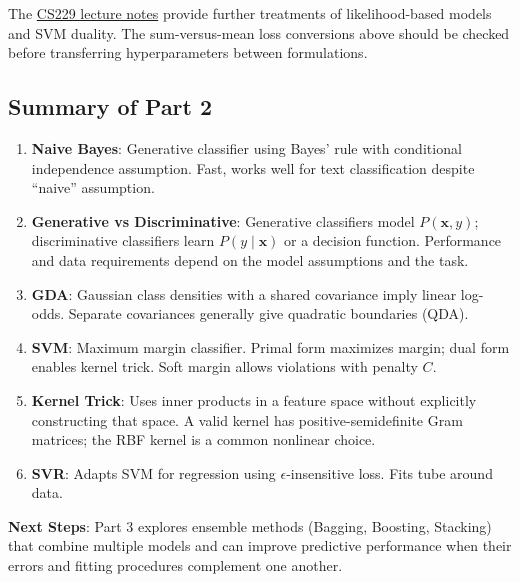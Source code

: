 \documentclass[11pt,twoside]{article}
\numberwithin{equation}{section}
\newcommand{\vect}[1]{\bm{#1}}
\theoremstyle{plain}
\theoremstyle{definition}
\theoremstyle{remark}
\begin{document}
The \href{https://cs229.stanford.edu/lectures-spring2022/main_notes.pdf}{CS229 lecture notes} provide further treatments of likelihood-based models and SVM duality. The sum-versus-mean loss conversions above should be checked before transferring hyperparameters between formulations.

\subsection{Summary of Part 2}

\begin{tcolorbox}[colback=yellow!10!white,colframe=orange!75!black,title=Key Takeaways]
\begin{enumerate}
\item \textbf{Naive Bayes}: Generative classifier using Bayes' rule with conditional independence assumption. Fast, works well for text classification despite ``naive'' assumption.

\item \textbf{Generative vs Discriminative}: Generative classifiers model $P(\vect{x},y)$; discriminative classifiers learn $P(y\mid\vect{x})$ or a decision function. Performance and data requirements depend on the model assumptions and the task.

\item \textbf{GDA}: Gaussian class densities with a shared covariance imply linear log-odds. Separate covariances generally give quadratic boundaries (QDA).

\item \textbf{SVM}: Maximum margin classifier. Primal form maximizes margin; dual form enables kernel trick. Soft margin allows violations with penalty $C$.

\item \textbf{Kernel Trick}: Uses inner products in a feature space without explicitly constructing that space. A valid kernel has positive-semidefinite Gram matrices; the RBF kernel is a common nonlinear choice.

\item \textbf{SVR}: Adapts SVM for regression using $\epsilon$-insensitive loss. Fits tube around data.
\end{enumerate}

\textbf{Next Steps}: Part 3 explores ensemble methods (Bagging, Boosting, Stacking) that combine multiple models and can improve predictive performance when their errors and fitting procedures complement one another.
\end{tcolorbox}
\end{document}
